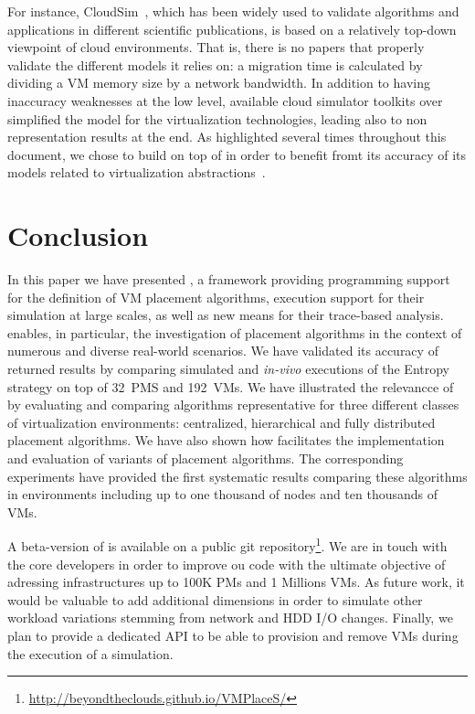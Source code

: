 For instance, CloudSim~\cite{cloudsim}, which has been widely used to
validate algorithms and applications in different scientific
publications, is based on a relatively top-down viewpoint of cloud
environments.  That is, there is no papers that properly validate the
different models it relies on: a migration time is calculated by
dividing a VM memory size by a network bandwidth.
 In addition to having inaccuracy weaknesses at the low level, available cloud
simulator toolkits over simplified the model for the virtualization
technologies, leading also to non representation results at the
end. As highlighted several times throughout this document, we chose to
build \vmps on top of \sg in order to benefit fromt its accuracy of
its models related to virtualization abstractions~\cite{Hirofuchi:2013:ALM:2568486.2568524}.

\section{Conclusion}
\label{sec:conclusion}
In this paper we have presented
\vmps, a framework providing programming support for the definition of
VM placement algorithms, execution support for their simulation at
large scales, as well as new means for their trace-based analysis.
\vmps enables, in particular, the investigation of placement
algorithms in the context of numerous and diverse real-world
scenarios. We have validated its accuracy of returned results by
comparing simulated and \textit{in-vivo} executions of the Entropy
strategy on top of 32~PMS and 192~VMs. We have illustrated the
relevancce of \vmps by evaluating and comparing algorithms
representative for three different classes of virtualization
environments: centralized, hierarchical and fully distributed
placement algorithms. We have also shown how \vmps facilitates the
implementation and evaluation of variants of placement algorithms. The
corresponding experiments have provided the first systematic results
comparing these algorithms in environments including up to one
thousand of nodes and ten thousands of VMs.

A beta-version of \vmps is available on a public git
repository\footnote{\url{http://beyondtheclouds.github.io/VMPlaceS/}}.
We are in touch with the \sg core developers in order to improve ou
code with the ultimate objective of adressing infrastructures up to
100K PMs and 1 Millions VMs. As future work, it would be valuable to add
additional dimensions in order to simulate other workload variations
stemming from network and HDD I/O changes. Finally,
we plan to provide a dedicated API to be able to
provision and remove VMs during the execution of a simulation.

